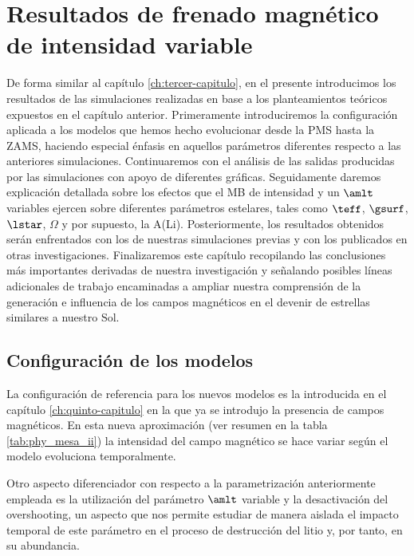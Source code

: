 

\chapter{Resultados de frenado magnético de intensidad variable}\label{ch:septimo-capitulo}
De forma similar al capítulo \ref{ch:tercer-capitulo}, en el presente introducimos los resultados de las simulaciones realizadas en base a los planteamientos teóricos expuestos en el capítulo anterior. Primeramente introduciremos la configuración aplicada a los modelos que hemos hecho evolucionar desde la PMS hasta la ZAMS, haciendo especial énfasis en aquellos parámetros diferentes respecto a las anteriores simulaciones. Continuaremos con el análisis de las salidas producidas por las simulaciones con apoyo de diferentes gráficas. Seguidamente daremos explicación detallada sobre los efectos que el MB de intensidad y un $\amlt$ variables ejercen sobre diferentes parámetros estelares, tales como $\teff$, $\gsurf$, $\lstar$, $\Omega$ y por supuesto, la A(Li). Posteriormente, los resultados obtenidos serán enfrentados con los de nuestras simulaciones previas y con los publicados en otras investigaciones. Finalizaremos este capítulo recopilando las conclusiones más importantes derivadas de nuestra investigación y señalando posibles líneas adicionales de trabajo encaminadas a ampliar nuestra comprensión de la generación e influencia de los campos magnéticos en el devenir de estrellas similares a nuestro Sol.\par


\section{Configuración de los modelos} \label{marco_teorico_ii}
La configuración de referencia para los nuevos modelos es la introducida en el capítulo \ref{ch:quinto-capitulo} en la que ya se introdujo la presencia de campos magnéticos. En esta nueva aproximación (ver resumen en la tabla \ref{tab:phy_mesa_ii}) la intensidad del campo magnético se hace variar según el modelo evoluciona temporalmente.\par 

Otro aspecto diferenciador con respecto a la parametrización anteriormente empleada es la utilización del parámetro $\amlt$ variable y la desactivación del overshooting, un aspecto que nos permite estudiar de manera aislada el impacto temporal de este parámetro en el proceso de destrucción del litio y, por tanto, en su abundancia.\par


